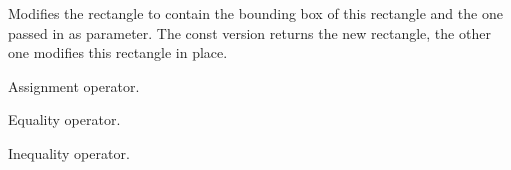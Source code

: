 

Modifies the rectangle to contain the bounding box of this rectangle and the
one passed in as parameter. The const version returns the new rectangle, the
other one modifies this rectangle in place.


\label{wxrectassign}


Assignment operator.


\label{wxrectequal}


Equality operator.


\label{wxrectnotequal}


Inequality operator.

